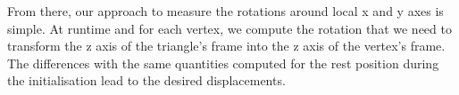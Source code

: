 From there, our approach to measure the rotations around local x and y axes is simple. At runtime and for each vertex, we compute the rotation that we need to transform the z axis of the triangle's frame into the z axis of the vertex's frame. The differences with the same quantities computed for the rest position during the initialisation lead to the desired displacements. 
%
%
%    
%
%    
%
%


%
%



